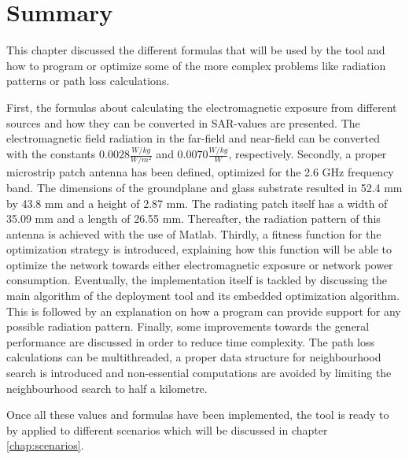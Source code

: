 \section{Summary}
This chapter discussed the different formulas that will be used by the tool and how to program or optimize
some of the more complex problems like radiation patterns or path loss calculations.

First, the formulas about calculating the electromagnetic exposure from different sources and how they 
can be converted in \gls{SAR}-values are presented. The electromagnetic field radiation in the far-field 
and near-field can be converted with the constants $0.0028 \frac{W/kg}{W/m^2}$ and  $0.0070 \frac{W/kg}{W}$, respectively.
Secondly, a proper microstrip patch antenna 
has been defined, optimized for the 2.6 GHz frequency band.
The dimensions of the groundplane and glass substrate resulted in 52.4 mm by 43.8 mm and a height of 2.87 mm. The radiating patch 
itself has a width of 35.09 mm and a length of 26.55 mm.
Thereafter, the radiation pattern of this
antenna is achieved with the use of Matlab. 
Thirdly, a fitness function for the optimization strategy is introduced, explaining how this function will be able 
to optimize the network towards either electromagnetic exposure or network power consumption.
Eventually, the implementation itself is tackled  by discussing the main algorithm of the deployment tool and its embedded optimization 
algorithm. This is followed by an explanation on how a program can provide support 
for any possible radiation pattern.  Finally, some improvements towards the general performance are discussed
in order to reduce time complexity. The path loss calculations can be multithreaded, a proper data structure for neighbourhood search 
is introduced and non-essential computations are avoided by limiting the neighbourhood search to half a kilometre.

Once all these values and formulas have been implemented, the tool is ready to by applied to different scenarios which will 
be discussed in chapter \ref{chap:scenarios}.